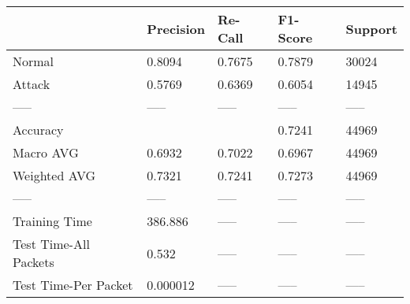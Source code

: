 \begin{tabular}{lllll}
\toprule
{} & Precision & Re-Call & F1-Score & Support \\
\midrule
Normal                &    0.8094 &  0.7675 &   0.7879 &   30024 \\
Attack                &    0.5769 &  0.6369 &   0.6054 &   14945 \\
-----                 &     ----- &   ----- &    ----- &   ----- \\
Accuracy              &           &         &   0.7241 &   44969 \\
Macro AVG             &    0.6932 &  0.7022 &   0.6967 &   44969 \\
Weighted AVG          &    0.7321 &  0.7241 &   0.7273 &   44969 \\
-----                 &     ----- &   ----- &    ----- &   ----- \\
Training Time         &   386.886 &   ----- &    ----- &   ----- \\
Test Time-All Packets &     0.532 &   ----- &    ----- &   ----- \\
Test Time-Per Packet  &  0.000012 &   ----- &    ----- &   ----- \\
\bottomrule
\end{tabular}
